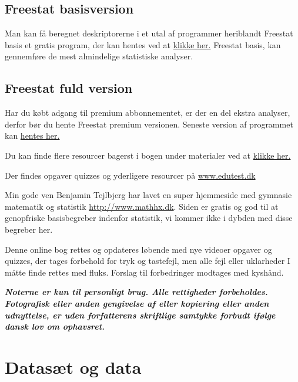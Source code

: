 \documentclass[]{book}
\begin{document}
\hypertarget{freestat-basisversion}{%
\section{Freestat basisversion}\label{freestat-basisversion}}

Man kan få beregnet deskriptorerne i et utal af programmer heriblandt Freestat basis et gratis program, der kan hentes ved at \href{https://www.dropbox.com/s/th8q95lf864npie/FREESTATfin.xlsx?dl=1}{klikke her.} Freestat basis, kan gennemføre de mest almindelige statistiske analyser.

\hypertarget{freestat-fuld-version}{%
\section{Freestat fuld version}\label{freestat-fuld-version}}

Har du købt adgang til premium abbonnementet, er der en del ekstra analyser, derfor bør du hente Freestat premium versionen. Seneste version af programmet kan \href{https://www.dropbox.com/s/a2jztexbxfzcli0/FREESTAT.xlsx?dl=1}{hentes her.}

Du kan finde flere resourcer bagerst i bogen under materialer ved at \href{https://s.tepedu.dk/materialer.html}{klikke her.}

Der findes opgaver quizzes og yderligere resourcer på \href{http://www.edutest.dk}{www.edutest.dk}

Min gode ven Benjamin Tejlbjerg har lavet en super hjemmeside med gymnasie matematik og statistik \href{http://www.mathhx.dk/?q=node/117}{http://www.mathhx.dk}. Siden er gratis og god til at genopfriske basisbegreber indenfor statistik, vi kommer ikke i dybden med disse begreber her.

Denne online bog rettes og opdateres løbende med nye videoer opgaver og quizzes, der tages forbehold for tryk og tastefejl, men alle fejl eller uklarheder I måtte finde rettes med fluks. Forslag til forbedringer modtages med kyshånd.

\textbf{\emph{Noterne er kun til personligt brug. Alle rettigheder forbeholdes. Fotografisk eller anden gengivelse af eller kopiering eller anden udnyttelse, er uden forfatterens skriftlige samtykke forbudt ifølge dansk lov om ophavsret.}}

\hypertarget{datast-og-data}{%
\chapter{Datasæt og data}\label{datast-og-data}}
\end{document}
